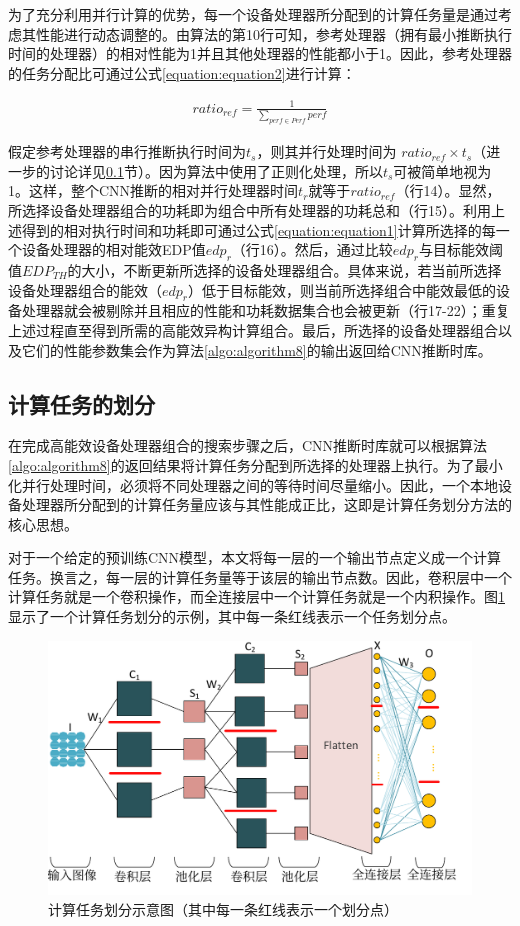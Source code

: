 为了充分利用并行计算的优势，每一个设备处理器所分配到的计算任务量是通过考虑其性能进行动态调整的。由算法的第10行可知，参考处理器（拥有最小推断执行时间的处理器）的相对性能为1并且其他处理器的性能都小于1。因此，参考处理器的任务分配比可通过公式\ref{equation:equation2}进行计算：

\begin{equation}
     \label{equation:equation2}
     \begin{aligned}
        ratio_{ref}=\frac{1}{\sum_{perf \in Perf}perf}
     \end{aligned}
\end{equation}

\noindent 假定参考处理器的串行推断执行时间为$t_s$，则其并行处理时间为 $ratio_{ref} \times t_s$（进一步的讨论详见\ref{chapter:chapter4-3-2}节）。因为算法中使用了正则化处理，所以$t_s$可被简单地视为1。这样，整个CNN推断的相对并行处理器时间$t_r$就等于$ratio_{ref}$（行14）。显然，所选择设备处理器组合的功耗即为组合中所有处理器的功耗总和（行15）。利用上述得到的相对执行时间和功耗即可通过公式\ref{equation:equation1}计算所选择的每一个设备处理器的相对能效EDP值$edp_r$（行16）。然后，通过比较$edp_r$与目标能效阈值$EDP_{TH}$的大小，不断更新所选择的设备处理器组合。具体来说，若当前所选择设备处理器组合的能效（$edp_r$）低于目标能效，则当前所选择组合中能效最低的设备处理器就会被剔除并且相应的性能和功耗数据集合也会被更新（行17-22）；重复上述过程直至得到所需的高能效异构计算组合。最后，所选择的设备处理器组合以及它们的性能参数集会作为算法\ref{algo:algorithm8}的输出返回给CNN推断时库。


\subsection{计算任务的划分}
\label{chapter:chapter4-3-2}

在完成高能效设备处理器组合的搜索步骤之后，CNN推断时库就可以根据算法\ref{algo:algorithm8}的返回结果将计算任务分配到所选择的处理器上执行。为了最小化并行处理时间，必须将不同处理器之间的等待时间尽量缩小。因此，一个本地设备处理器所分配到的计算任务量应该与其性能成正比，这即是计算任务划分方法的核心思想。

对于一个给定的预训练CNN模型，本文将每一层的一个输出节点定义成一个计算任务。换言之，每一层的计算任务量等于该层的输出节点数。因此，卷积层中一个计算任务就是一个卷积操作，而全连接层中一个计算任务就是一个内积操作。图\ref{figure:figure30}显示了一个计算任务划分的示例，其中每一条红线表示一个任务划分点。

\begin{figure}[htbp]
    \centering
    \includegraphics[height=0.4\textwidth]{figures/compute_tasks.pdf}
    \caption{计算任务划分示意图（其中每一条红线表示一个划分点）}\label{figure:figure30}
\end{figure}

